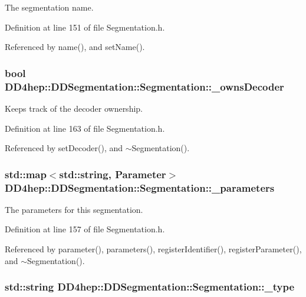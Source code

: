 The segmentation name. 

Definition at line 151 of file Segmentation.h.

Referenced by name(), and setName().\hypertarget{class_d_d4hep_1_1_d_d_segmentation_1_1_segmentation_a0e9e3e6639a67335971b827cf045cd4f}{
\subsubsection[{\_\-ownsDecoder}]{\setlength{\rightskip}{0pt plus 5cm}bool {\bf DD4hep::DDSegmentation::Segmentation::\_\-ownsDecoder}}}
\label{class_d_d4hep_1_1_d_d_segmentation_1_1_segmentation_a0e9e3e6639a67335971b827cf045cd4f}


Keeps track of the decoder ownership. 

Definition at line 163 of file Segmentation.h.

Referenced by setDecoder(), and $\sim$Segmentation().\hypertarget{class_d_d4hep_1_1_d_d_segmentation_1_1_segmentation_a7ede8a80772ee04c5997696734f0c200}{
\subsubsection[{\_\-parameters}]{\setlength{\rightskip}{0pt plus 5cm}std::map$<$std::string, {\bf Parameter}$>$ {\bf DD4hep::DDSegmentation::Segmentation::\_\-parameters}}}
\label{class_d_d4hep_1_1_d_d_segmentation_1_1_segmentation_a7ede8a80772ee04c5997696734f0c200}


The parameters for this segmentation. 

Definition at line 157 of file Segmentation.h.

Referenced by parameter(), parameters(), registerIdentifier(), registerParameter(), and $\sim$Segmentation().\hypertarget{class_d_d4hep_1_1_d_d_segmentation_1_1_segmentation_a3dab8fc421e90851cc45b20b90754271}{
\subsubsection[{\_\-type}]{\setlength{\rightskip}{0pt plus 5cm}std::string {\bf DD4hep::DDSegmentation::Segmentation::\_\-type}}}
\label{class_d_d4hep_1_1_d_d_segmentation_1_1_segmentation_a3dab8fc421e90851cc45b20b90754271}


